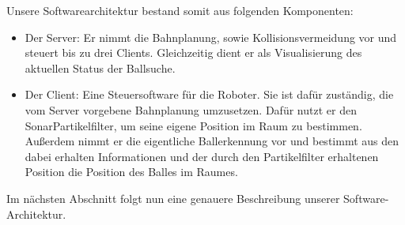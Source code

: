 Unsere Softwarearchitektur bestand somit aus folgenden Komponenten:
\begin{itemize}
\item Der Server: Er nimmt die Bahnplanung, sowie Kollisionsvermeidung
  vor und steuert bis zu drei Clients. Gleichzeitig dient er als
  Visualisierung des aktuellen Status der Ballsuche.
\item Der Client: Eine Steuersoftware für die Roboter. Sie ist dafür
  zuständig, die vom Server vorgebene Bahnplanung umzusetzen. Dafür
  nutzt er den SonarPartikelfilter, um seine eigene Position im Raum
  zu bestimmen. Außerdem nimmt er die eigentliche Ballerkennung vor
  und bestimmt aus den dabei erhalten Informationen und der durch den
  Partikelfilter erhaltenen Position die Position des Balles im Raumes.
\end{itemize}
Im nächsten Abschnitt folgt nun eine genauere Beschreibung unserer
Software-Architektur.
